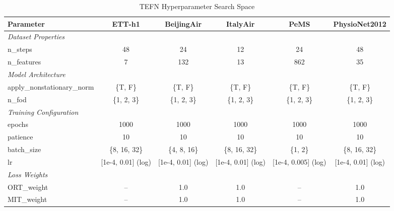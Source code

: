 \begin{table}[H]
\centering
\caption{TEFN Hyperparameter Search Space}
\label{tab:hyperparam_tefn}
\begin{adjustbox}{max width=\textwidth}
\begin{small}
\begin{tabular}{l|ccccc}
\toprule
\textbf{Parameter} & \textbf{ETT-h1} & \textbf{BeijingAir} & \textbf{ItalyAir} & \textbf{PeMS} & \textbf{PhysioNet2012} \\
\midrule
\multicolumn{6}{l}{\textit{Dataset Properties}} \\
n\_steps & 48 & 24 & 12 & 24 & 48 \\
n\_features & 7 & 132 & 13 & 862 & 35 \\
\midrule
\multicolumn{6}{l}{\textit{Model Architecture}} \\
apply\_nonstationary\_norm & \{T, F\} & \{T, F\} & \{T, F\} & \{T, F\} & \{T, F\} \\
n\_fod & \{1, 2, 3\} & \{1, 2, 3\} & \{1, 2, 3\} & \{1, 2, 3\} & \{1, 2, 3\} \\
\midrule
\multicolumn{6}{l}{\textit{Training Configuration}} \\
epochs & 1000 & 1000 & 1000 & 1000 & 1000 \\
patience & 10 & 10 & 10 & 10 & 10 \\
batch\_size & \{8, 16, 32\} & \{4, 8, 16\} & \{8, 16, 32\} & \{1, 2\} & \{8, 16, 32\} \\
lr & [1e-4, 0.01] (log) & [1e-4, 0.01] (log) & [1e-4, 0.01] (log) & [1e-4, 0.005] (log) & [1e-4, 0.01] (log) \\
\midrule
\multicolumn{6}{l}{\textit{Loss Weights}} \\
ORT\_weight & -- & 1.0 & 1.0 & -- & 1.0 \\
MIT\_weight & -- & 1.0 & 1.0 & -- & 1.0 \\
\bottomrule
\end{tabular}
\end{small}
\end{adjustbox}
\end{table}